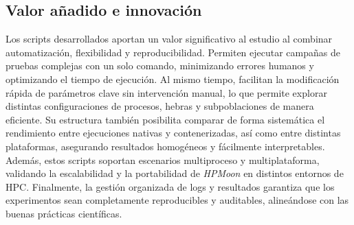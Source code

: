 \subsection{Valor añadido e innovación}

Los scripts desarrollados aportan un valor significativo al estudio al combinar automatización, flexibilidad y reproducibilidad. Permiten ejecutar campañas de pruebas complejas con un solo comando, minimizando errores humanos y optimizando el tiempo de ejecución. Al mismo tiempo, facilitan la modificación rápida de parámetros clave sin intervención manual, lo que permite explorar distintas configuraciones de procesos, hebras y subpoblaciones de manera eficiente. Su estructura también posibilita comparar de forma sistemática el rendimiento entre ejecuciones nativas y contenerizadas, así como entre distintas plataformas, asegurando resultados homogéneos y fácilmente interpretables. Además, estos scripts soportan escenarios multiproceso y multiplataforma, validando la escalabilidad y la portabilidad de \textit{HPMoon} en distintos entornos de HPC. Finalmente, la gestión organizada de logs y resultados garantiza que los experimentos sean completamente reproducibles y auditables, alineándose con las buenas prácticas científicas.